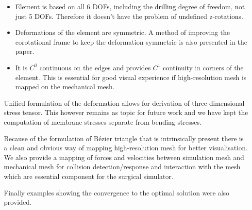\documentclass{egpubl}
\begin{document}
\begin{itemize}

    \item Element is based on all 6 DOFs, including the drilling degree of
        freedom, not just 5 DOFs. Therefore it doesn't have the problem of
        undefined z-rotations.

    \item Deformations of the element are symmetric. A method of improving
    the corotational frame to keep the deformation symmetric is also
    presented in the paper.

    \item It is $C^0$ continuous on the edges and provides $C^1$ continuity in
    corners of the element. This is essential for good visual experience if
    high-resolution mesh is mapped on the mechanical mesh.


\end{itemize}

Unified formulation of the deformation allows for derivation of three-dimensional 
stress tensor. This however remains as topic for future work and
we have kept the computation of membrane stresses separate from bending stresses.

Because of the formulation of B\'ezier triangle that is intrinsically present
there is a clean and obvious way of mapping high-resolution mesh for
better visualisation. We also provide a mapping of forces and velocities
between simulation mesh and mechanical mesh for collision detection/response
and interaction with the mesh which are essential component for the surgical
simulator.

Finally examples showing the convergence to the optimal solution were also provided. 



%



\end{document}
